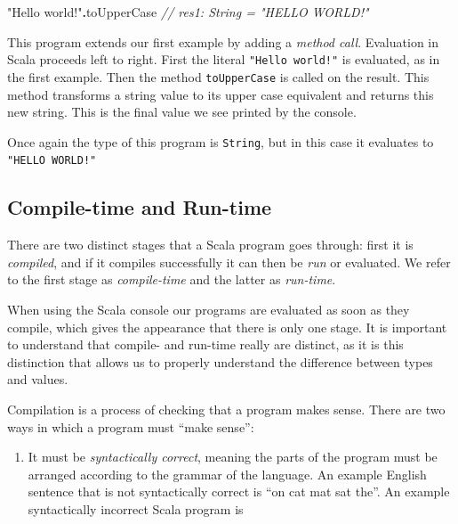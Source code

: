 \documentclass[11pt,a5paper,]{book}
\newenvironment{Shaded}{\begin{snugshade}}{\end{snugshade}}
\newcommand{\CommentTok}[1]{\textcolor[rgb]{0.56,0.35,0.01}{\textit{#1}}}
\newcommand{\NormalTok}[1]{#1}
\newcommand{\OperatorTok}[1]{\textcolor[rgb]{0.81,0.36,0.00}{\textbf{#1}}}
\newcommand{\StringTok}[1]{\textcolor[rgb]{0.31,0.60,0.02}{#1}}
\providecommand{\tightlist}{%
  \setlength{\itemsep}{0pt}\setlength{\parskip}{0pt}}
\begin{document}
\begin{Shaded}
\begin{Highlighting}[]
\StringTok{"Hello world!"}\OperatorTok{.}\NormalTok{toUpperCase}
\CommentTok{// res1: String = "HELLO WORLD!"}
\end{Highlighting}
\end{Shaded}

This program extends our first example by adding a \emph{method call}.
Evaluation in Scala proceeds left to right. First the literal
\texttt{"Hello\ world!"} is evaluated, as in the first example. Then the
method \texttt{toUpperCase} is called on the result. This method
transforms a string value to its upper case equivalent and returns this
new string. This is the final value we see printed by the console.

Once again the type of this program is \texttt{String}, but in this case
it evaluates to \texttt{"HELLO\ WORLD!"}

\hypertarget{compile-time-and-run-time}{%
\subsection{Compile-time and Run-time}\label{compile-time-and-run-time}}

There are two distinct stages that a Scala program goes through: first
it is \emph{compiled}, and if it compiles successfully it can then be
\emph{run} or evaluated. We refer to the first stage as
\emph{compile-time} and the latter as \emph{run-time}.

When using the Scala console our programs are evaluated as soon as they
compile, which gives the appearance that there is only one stage. It is
important to understand that compile- and run-time really are distinct,
as it is this distinction that allows us to properly understand the
difference between types and values.

Compilation is a process of checking that a program makes sense. There
are two ways in which a program must ``make sense'':

\begin{enumerate}
\def\labelenumi{\arabic{enumi}.}
\tightlist
\item
  It must be \emph{syntactically correct}, meaning the parts of the
  program must be arranged according to the grammar of the language. An
  example English sentence that is not syntactically correct is ``on cat
  mat sat the''. An example syntactically incorrect Scala program is
\end{enumerate}
\end{document}
